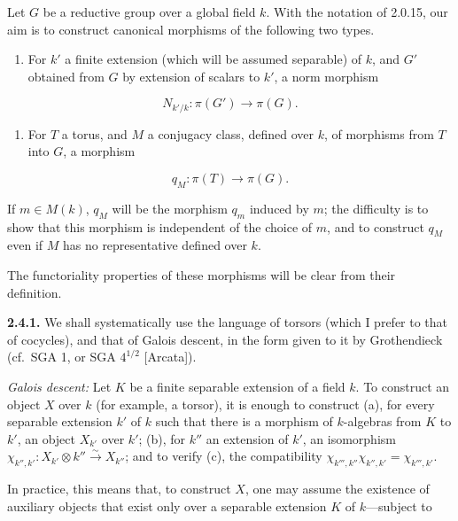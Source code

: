 \documentclass[10pt,a4paper]{article}
\providecommand{\tightlist}{\setlength{\itemsep}{0pt}\setlength{\parskip}{0pt}}
\begin{document}
Let \(G\) be a reductive group over a global field \(k\). With the notation of 2.0.15, our aim is to construct canonical morphisms of the following two types.

\begin{enumerate}
\def\labelenumi{(\alph{enumi})}
\tightlist
\item
  For \(k'\) a finite extension (which will be assumed separable) of \(k\), and \(G'\) obtained from \(G\) by extension of scalars to \(k'\), a norm morphism
\end{enumerate}

\[
N_{k'/k}:\pi(G')\longrightarrow\pi(G). \tag{2.4.0.1}
\]

\begin{enumerate}
\def\labelenumi{(\alph{enumi})}
\setcounter{enumi}{1}
\tightlist
\item
  For \(T\) a torus, and \(M\) a conjugacy class, defined over \(k\), of morphisms from \(T\) into \(G\), a morphism
\end{enumerate}

\[
q_M:\pi(T)\longrightarrow\pi(G). \tag{2.4.0.2}
\]

If \(m\in M(k)\), \(q_M\) will be the morphism \(q_m\) induced by \(m\); the difficulty is to show that this morphism is independent of the choice of \(m\), and to construct \(q_M\) even if \(M\) has no representative defined over \(k\).

The functoriality properties of these morphisms will be clear from their definition.

\textbf{2.4.1.} We shall systematically use the language of torsors (which I prefer to that of cocycles), and that of Galois descent, in the form given to it by Grothendieck (cf.~SGA 1, or SGA \(4^{1/2}\) {[}Arcata{]}).

\emph{Galois descent:} Let \(K\) be a finite separable extension of a field \(k\). To construct an object \(X\) over \(k\) (for example, a torsor), it is enough to construct (a), for every separable extension \(k'\) of \(k\) such that there is a morphism of \(k\)-algebras from \(K\) to \(k'\), an object \(X_{k'}\) over \(k'\); (b), for \(k''\) an extension of \(k'\), an isomorphism \(\chi_{k'',k'}:X_{k'}\otimes k''\xrightarrow{\sim}X_{k''}\); and to verify (c), the compatibility \(\chi_{k''',k''}\chi_{k'',k'}=\chi_{k''',k'}\).

In practice, this means that, to construct \(X\), one may assume the existence of auxiliary objects that exist only over a separable extension \(K\) of \(k\)---subject to
\end{document}
